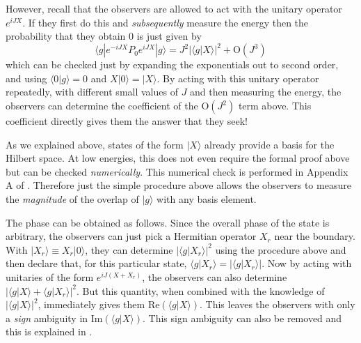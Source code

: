 \documentclass[12pt]{article}
\def\Or[#1]{{\text{O}}\left({#1}\right)}
\newcommand{\be}{\begin{equation}}
\newcommand{\ee}{\end{equation}}
\def\projvac{{\cal P}_{\Omega}}
\def\projvac{P_0}
\begin{document}
However, recall that the observers are allowed to act with the unitary operator $e^{i J X}$. If they first do this and  {\em subsequently} measure the energy then the probability that they obtain $0$ is just given by 
\be
\langle g | e^{-i J X} \projvac e^{i J X} | g \rangle =  J^2 |\langle g | X \rangle|^2 + \Or[J^3]
\ee
which can be checked just by expanding the exponentials out to second order, and using $\langle 0 | g \rangle = 0$ and $X|0 \rangle = |X \rangle$. By acting with this unitary operator repeatedly, with different small values of $J$ and then measuring the energy, the observers can determine the coefficient of the $\Or[J^2]$ term above. This coefficient directly gives them the answer that they seek!






As we explained above, states of the form $| X \rangle$ already provide a basis for the Hilbert space. At low energies, this does not even require the formal proof above but can be checked {\em numerically}. This numerical check is performed in Appendix A of \cite{Chowdhury:2020hse}. Therefore just the simple procedure above allows the observers to measure the {\em magnitude} of the overlap of $|g \rangle$ with any basis element. 

The phase can be obtained as follows.  Since the overall phase of the state is arbitrary, the observers can just pick a Hermitian operator $X_r$ near the boundary.  With $|X_r \rangle \equiv X_r | 0 \rangle$, they can determine $|\langle g| X_r \rangle|^2$ using the procedure above and then declare that, for this particular state,  $\langle g | X_r \rangle = |\langle g | X_r \rangle|$. Now by acting with unitaries of the form $e^{i J(X + X_r)}$, the observers can also determine $|\langle g| X \rangle + \langle g | X_r \rangle|^2$. But this quantity, when combined with the knowledge of $|\langle g| X \rangle|^2$, immediately gives them  $\text{Re} \left(\langle g | X \rangle\right)$. This leaves the observers with only a {\em sign} ambiguity in $\text{Im}(\langle g | X \rangle)$. This sign ambiguity can also be removed and this is  explained in \cite{Chowdhury:2020hse}. 
\end{document}
